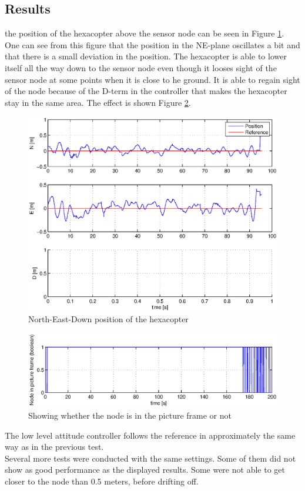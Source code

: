 \subsection{Results}
the position of the hexacopter above the sensor node can be seen in Figure \ref{posDriftSITL}. One can see from this figure that the position in the NE-plane oscillates a bit and that there is a small deviation in the position. The hexacopter is able to lower itself all the way down to the sensor node even though it looses sight of the sensor node at some points when it is close to he ground. It is able to regain sight of the node because of the D-term in the controller that makes the hexacopter stay in the same area. The effect is shown Figure \ref{inFrame}.
\begin{figure}[H]
\centering
\includegraphics[width = 12cm]{fig/plots/sitl/posDrift.eps}
\caption{North-East-Down position of the hexacopter}
\label{posDriftSITL}
\end{figure}
\begin{figure}[H]
\centering
\includegraphics[width = 12cm]{fig/plots/sitl/inFrameDrift.eps}
\caption{Showing whether the node is in the picture frame or not}
\label{inFrame}
\end{figure}
\noindent
The low level attitude controller follows the reference in approximately the same way as in the previous test.\\
\newline
Several more tests were conducted with the same settings. Some of them did not show as good performance as the displayed results. Some were not able to get closer to the node than 0.5 meters, before drifting off.
